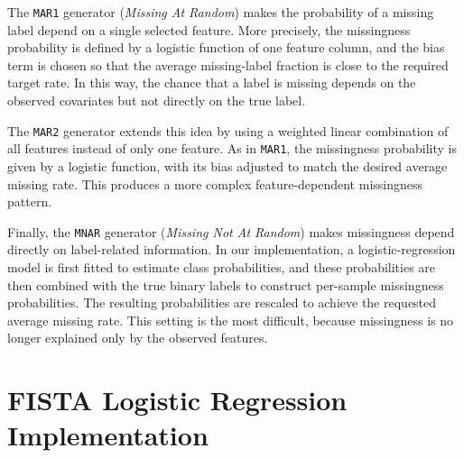 \documentclass[8pt,a4paper]{extarticle}
\begin{document}
The \texttt{MAR1} generator (\emph{Missing At Random}) makes the probability of a missing label depend on a single selected feature. More precisely, the missingness probability is defined by a logistic function of one feature column, and the bias term is chosen so that the average missing-label fraction is close to the required target rate. In this way, the chance that a label is missing depends on the observed covariates but not directly on the true label.

The \texttt{MAR2} generator extends this idea by using a weighted linear combination of all features instead of only one feature. As in \texttt{MAR1}, the missingness probability is given by a logistic function, with its bias adjusted to match the desired average missing rate. This produces a more complex feature-dependent missingness pattern.

Finally, the \texttt{MNAR} generator (\emph{Missing Not At Random}) makes missingness depend directly on label-related information. In our implementation, a logistic-regression model is first fitted to estimate class probabilities, and these probabilities are then combined with the true binary labels to construct per-sample missingness probabilities. The resulting probabilities are rescaled to achieve the requested average missing rate. This setting is the most difficult, because missingness is no longer explained only by the observed features.

\section{FISTA Logistic Regression Implementation}
\end{document}
